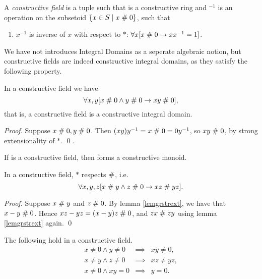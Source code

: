 
\begin{definition}\label{deffield}
A {\em constructive field\/} is a tuple
 such that
 is a constructive ring and $^{-1}$ is an
operation on the subsetoid $\{x\in S\mid x\mathrel{\#} 0\}$, such that
\begin{enumerate}     
\item $x^{-1}$ is inverse of $x$ with respect to $*$:\quad
    $\forall x[x\mathrel{\#} 0 \rightarrow x x^{-1}=1]$.
\end{enumerate}
\end{definition}

We have not introduces Integral Domains as a seperate algebraic
notion, but constructive fields are indeed constructive integral
domains, as they satisfy the following property.

\begin{lemma}\label{lemidfield}
In a constructive field we have
$$\forall x,y [x\mathrel{\#} 0 \wedge y\mathrel{\#} 0 \rightarrow x y \mathrel{\#} 0],$$
that is, a constructive field is a constructive integral domain.
\end{lemma}

\begin{proof}
Suppose $x\mathrel{\#} 0, y\mathrel{\#} 0$. Then $(x y) y^{-1} =x \mathrel{\#} 0= 0 y^{-1}$, 
so $x y \mathrel{\#} 0$, by strong extensionality of $*$. \qed.  
\end{proof}

\begin{lemma}\label{nonzsetoid}
If  is a constructive field,
then  forms a
constructive monoid.
\end{lemma}

\begin{lemma}\label{intmulrespap}
In a constructive field, $*$ respects $\mathrel{\#}$, i.e.
\[
\forall x,y,z[x\mathrel{\#} y \wedge z\mathrel{\#} 0 \rightarrow x z \mathrel{\#} y z].
\]
\end{lemma}
\begin{proof}
  Suppose $x\mathrel{\#} y$ and $z\mathrel{\#} 0$. By lemma \ref{lemgrstrext}, we
  have that $x-y \mathrel{\#} 0$.  Hence $x z-y z=(x-y)z\mathrel{\#} 0$, and 
  $z x\mathrel{\#} z y$ using lemma \ref{lemgrstrext} again. \qed
\end{proof}


\begin{lemma}\label{lempropid}
The following hold in a constructive field.
\begin{eqnarray*}
x\neq 0 \wedge y\neq 0 &\implies& x y \neq 0,\\
x\neq y \wedge z\neq 0 &\implies& x z \neq y  z,\\
x\neq0 \wedge x y = 0 &\implies & y=0.
\end{eqnarray*}
\end{lemma}

